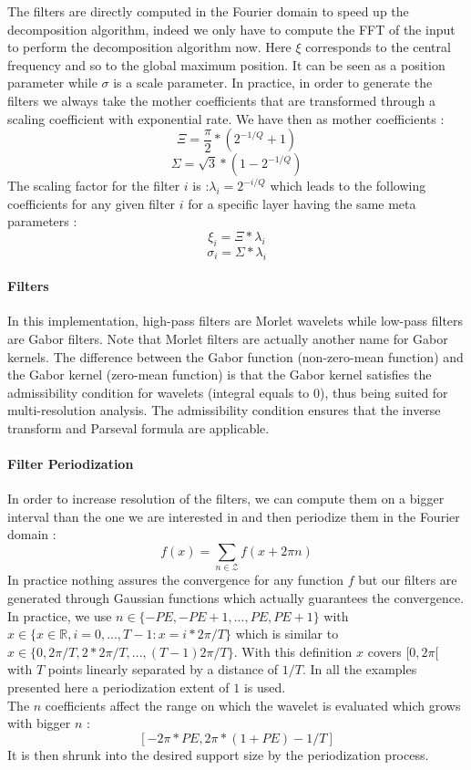 \documentclass[a4paper]{report}
\begin{document}
The filters are directly computed in the Fourier domain to speed up the decomposition algorithm, indeed we only have to compute the FFT of the input to perform the decomposition algorithm now. Here $\xi$ corresponds to the central frequency and so to the global maximum position. It can be seen as a position parameter while $\sigma$ is a scale parameter. In practice, in order to generate the filters we always take the mother coefficients that are transformed through a scaling coefficient with exponential rate. We have then as mother coefficients :
\[
\Xi=\frac{\pi}{2}*(2^{-1/Q}+1)
\]
\[
\Sigma=\sqrt{3}*(1-2^{-1/Q})
\]
The scaling factor for the filter $i$ is :$\lambda_i=2^{-i/Q}$ which leads to the following coefficients for any given filter $i$ for a specific layer having the same meta parameters :
\[
\xi_i=\Xi*\lambda_i
\]
\[
\sigma_i=\Sigma*\lambda_i
\]


\paragraph{Filters} In this implementation, high-pass filters are Morlet wavelets while low-pass filters are Gabor filters. Note that Morlet filters are actually another name for Gabor kernels. The difference between the Gabor function (non-zero-mean function) and the Gabor kernel (zero-mean function) is that the Gabor kernel satisfies the admissibility condition for wavelets (integral equals to $0$), thus being suited for multi-resolution analysis. The admissibility condition ensures that the inverse transform and Parseval formula are applicable.

\paragraph{Filter Periodization}
In order to increase resolution of the filters, we can compute them on a bigger interval than the one we are interested in and then periodize them in the Fourier domain :
\[
f(x)=\sum_{n\in \mathcal{Z}} f(x+2\pi n) 
\]
In practice nothing assures the convergence for any function $f$ but our filters are generated through Gaussian functions which actually guarantees the convergence. In practice, we use $n\in \{-PE, -PE+1,...,PE,PE+1 \}$ with $x \in \{ x \in \mathbb{R}, i=0,...,T-1 : x= i*2\pi/T\} $ which is similar to $x \in \{0,2\pi/T,2*2\pi/T,...,(T-1)2\pi/T \} $.
With this definition $x$ covers $[0,2\pi[$ with $T$ points linearly separated by a distance of $1/T$.
In all the examples presented here a periodization extent of $1$ is used.
\\
The $n$ coefficients affect the range on which the wavelet is evaluated which grows with bigger $n$ : 
\[ [  -2\pi * PE, 2\pi*(1+PE)-1/T ] \]
It is then shrunk into the desired support size by the periodization process.
\end{document}
